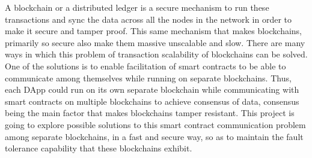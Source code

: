 \documentclass[a4paper,twoside,phd]{BYUPhys}
\begin{document}
A blockchain or a distributed ledger is a secure mechanism to run these transactions and sync the data across all the nodes in the network in order to make it secure and tamper proof. This same mechanism that makes blockchains, primarily so secure also make them massive unscalable and slow. There are many ways in which this problem of transaction scalability of blockchains can be solved. One of the solutions is to enable facilitation of smart contracts to be able to communicate among themselves while running on separate blockchains. Thus, each DApp could run on its own separate blockchain while communicating with smart contracts on multiple blockchains to achieve consensus of data, consensus being the main factor that makes blockchains tamper resistant. This project is going to explore possible solutions to this smart contract communication problem among separate blockchains, in a fast and secure way, so as to maintain the fault tolerance capability that these blockchains exhibit.
\end{document}
